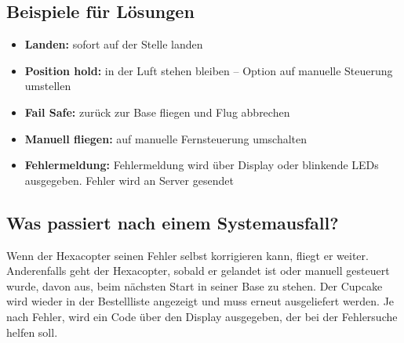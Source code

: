 \subsection*{Beispiele für Lösungen}
\begin{itemize}
\item \textbf{Landen:} sofort auf der Stelle landen
\item \textbf{Position hold:} in der Luft stehen bleiben – Option auf manuelle Steuerung umstellen
\item \textbf{Fail Safe:} zurück zur Base fliegen und Flug abbrechen
\item \textbf{Manuell fliegen:} auf manuelle Fernsteuerung umschalten
\item \textbf{Fehlermeldung:} Fehlermeldung wird über Display oder blinkende LEDs ausgegeben. Fehler wird an Server gesendet
\end{itemize}

\subsection*{Was passiert nach einem Systemausfall?}
Wenn der Hexacopter seinen Fehler selbst korrigieren kann, fliegt er weiter.
Anderenfalls geht der Hexacopter, sobald er gelandet ist oder manuell gesteuert wurde, davon aus, beim nächsten Start in seiner Base zu stehen. Der Cupcake wird wieder in der Bestellliste angezeigt und muss erneut ausgeliefert werden. Je nach Fehler, wird ein Code über den Display ausgegeben, der bei der Fehlersuche helfen soll.
